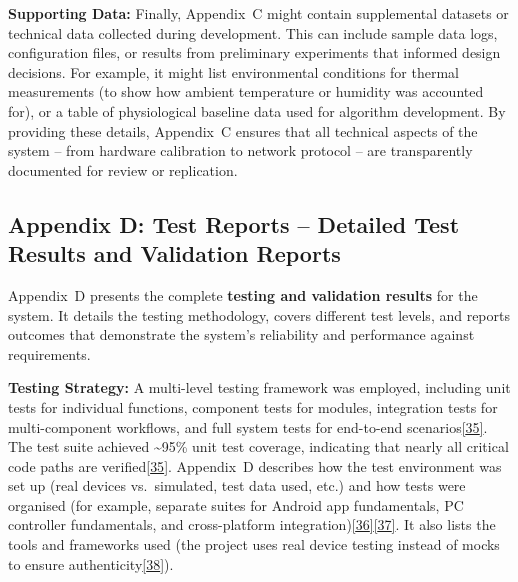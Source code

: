 \documentclass[12pt,a4paper]{article}
\begin{document}
\textbf{Supporting Data:} Finally, Appendix~C might contain supplemental datasets or technical data collected during development. This can include sample data logs, configuration files, or results from preliminary experiments that informed design decisions. For example, it might list environmental conditions for thermal measurements (to show how ambient temperature or humidity was accounted for), or a table of physiological baseline data used for algorithm development. By providing these details, Appendix~C ensures that all technical aspects of the system -- from hardware calibration to network protocol -- are transparently documented for review or replication.

\subsection{Appendix D: Test Reports -- Detailed Test Results and Validation Reports}\label{appendix-d-test-reports-detailed-test-results-and-validation-reports}

Appendix~D presents the complete \textbf{testing and validation results} for the system. It details the testing methodology, covers different test levels, and reports outcomes that demonstrate the system's reliability and performance against requirements.

\textbf{Testing Strategy:} A multi-level testing framework was employed, including unit tests for individual functions, component tests for modules, integration tests for multi-component workflows, and full system tests for end-to-end scenarios\href{docs/README.md\#L83-L88}{{[}35{]}}. The test suite achieved \textasciitilde95\% unit test coverage, indicating that nearly all critical code paths are verified\href{docs/README.md\#L83-L88}{{[}35{]}}. Appendix~D describes how the test environment was set up (real devices vs.~simulated, test data used, etc.) and how tests were organised (for example, separate suites for Android app fundamentals, PC controller fundamentals, and cross-platform integration)\href{evaluation_results/execution_logs.md\#L16-L24}{{[}36{]}}\href{evaluation_results/execution_logs.md\#L38-L46}{{[}37{]}}. It also lists the tools and frameworks used (the project uses real device testing instead of mocks to ensure authenticity\href{evaluation_results/execution_logs.md\#L104-L113}{{[}38{]}}).
\end{document}
